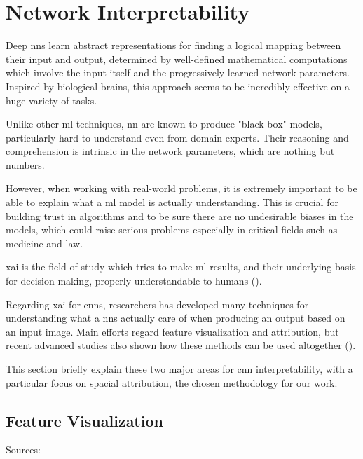 \section{Network Interpretability}
\label{sec:network-interpretability}


Deep \gls{nn}s learn abstract representations for finding a logical mapping between their input and output, determined by well-defined mathematical computations which involve the input itself and the progressively learned network parameters. Inspired by biological brains, this approach seems to be incredibly effective on a huge variety of tasks.

Unlike other \gls{ml} techniques, \gls{nn} are known to produce "black-box" models, particularly hard to understand even from domain experts. Their reasoning and comprehension is intrinsic in the network parameters, which are nothing but numbers.

\medskip 

However, when working with real-world problems, it is extremely important to be able to explain what a \gls{ml} model is actually understanding. This is crucial for building trust in algorithms and to be sure there are no undesirable biases in the models, which could raise serious problems especially in critical fields such as medicine and law.

\gls{xai} is the field of study which tries to make \gls{ml} results, and their underlying basis for decision-making, properly understandable to humans (\cite{xai-wiki}). 

\medskip 

Regarding \gls{xai} for \gls{cnn}s, researchers has developed many techniques for understanding what a \gls{nn}s actually care of when producing an output based on an input image. Main efforts regard feature visualization and attribution, but recent advanced studies also shown how these methods can be used altogether (\cite{olah2018the}).

This section briefly explain these two major areas for \gls{cnn} interpretability, with a particular focus on spacial attribution, the chosen methodology for our work.



\subsection{Feature Visualization}

Sources: \cite{olah2017feature}



